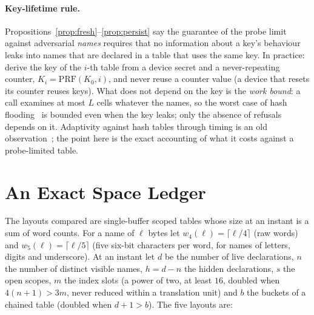 \documentclass[11pt,a4paper]{article}
\theoremstyle{definition}
\theoremstyle{remark}
\newcommand{\ceil}[1]{\lceil #1\rceil}
\begin{document}
\begin{table}[t]
\centering\small
\caption{Honest names refused by the probe limit (percent of \AdHonest): the adversary's learned colliders declared first. Mean over \AdSeeds{} seeds; maximum over seeds for the persistent key.}\label{tab:adaptive}

\end{table}

\paragraph{Key-lifetime rule.} Propositions~\ref{prop:fresh}--\ref{prop:persist} say the guarantee of the probe limit against adversarial \emph{names} requires that no information about a key's behaviour leaks into names that are declared in a table that uses the same key. In practice: derive the key of the $i$-th table from a device secret and a never-repeating counter, $K_i=\mathrm{PRF}(K_0,i)$, and never reuse a counter value (a device that resets its counter reuses keys). What does not depend on the key is the \emph{work bound}: a call examines at most $L$ cells whatever the names, so the worst case of hash flooding~\cite{crosby2003,aumasson2012} is bounded even when the key leaks; only the absence of refusals depends on it. Adaptivity against hash tables through timing is an old observation~\cite{lipton1993,naor2015}; the point here is the exact accounting of what it costs against a probe-limited table.

\section{An Exact Space Ledger}\label{sec:ledger}

The layouts compared are single-buffer scoped tables whose size at an instant is a sum of word counts. For a name of $\ell$ bytes let $w_4(\ell)=\ceil{\ell/4}$ (raw words) and $w_5(\ell)=\ceil{\ell/5}$ (five six-bit characters per word, for names of letters, digits and underscore). At an instant let $d$ be the number of live declarations, $n$ the number of distinct visible names, $h=d-n$ the hidden declarations, $s$ the open scopes, $m$ the index slots (a power of two, at least $16$, doubled when $4(n+1)>3m$, never reduced within a translation unit) and $b$ the buckets of a chained table (doubled when $d+1>b$). The five layouts are:
\end{document}
